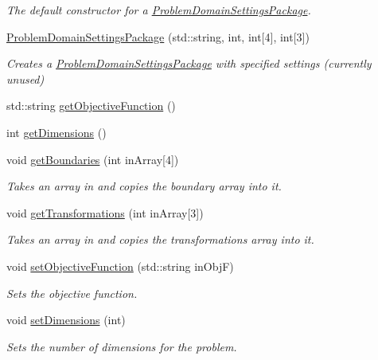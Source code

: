 \begin{DoxyCompactItemize}
\begin{DoxyCompactList}\small\item\em The default constructor for a \hyperlink{class_problem_domain_settings_package}{Problem\+Domain\+Settings\+Package}. \end{DoxyCompactList}\item 
\hyperlink{class_problem_domain_settings_package_a02eab8199d5811638c3fd891d9f25a30}{Problem\+Domain\+Settings\+Package} (std\+::string, int, int\mbox{[}4\mbox{]}, int\mbox{[}3\mbox{]})
\begin{DoxyCompactList}\small\item\em Creates a \hyperlink{class_problem_domain_settings_package}{Problem\+Domain\+Settings\+Package} with specified settings (currently unused) \end{DoxyCompactList}\item 
std\+::string \hyperlink{class_problem_domain_settings_package_a858c5f6501fe46a6469422ca87cbc227}{get\+Objective\+Function} ()
\item 
int \hyperlink{class_problem_domain_settings_package_a1ff00f66433a26e87176915159207a53}{get\+Dimensions} ()
\item 
void \hyperlink{class_problem_domain_settings_package_a004beb40525bd9254a1e9cbb60aac7c9}{get\+Boundaries} (int in\+Array\mbox{[}4\mbox{]})
\begin{DoxyCompactList}\small\item\em Takes an array in and copies the boundary array into it. \end{DoxyCompactList}\item 
void \hyperlink{class_problem_domain_settings_package_a8c3955959c0d222493362fe1ebad8885}{get\+Transformations} (int in\+Array\mbox{[}3\mbox{]})
\begin{DoxyCompactList}\small\item\em Takes an array in and copies the transformations array into it. \end{DoxyCompactList}\item 
void \hyperlink{class_problem_domain_settings_package_ad08819f63bb7d05409489ba9c6049f92}{set\+Objective\+Function} (std\+::string in\+ObjF)
\begin{DoxyCompactList}\small\item\em Sets the objective function. \end{DoxyCompactList}\item 
void \hyperlink{class_problem_domain_settings_package_a99993d6577bd93023adb2cdad0443069}{set\+Dimensions} (int)
\begin{DoxyCompactList}\small\item\em Sets the number of dimensions for the problem. \end{DoxyCompactList}\item 

\end{DoxyCompactItemize}
